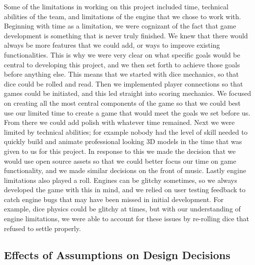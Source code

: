 \documentclass{article}
\begin{document}
Some of the limitations in working on this project included time, technical abilities of the team, and limitations of the engine that we chose to work with. Beginning with time as a limitation, we were cognizant of the fact that game development is something that is never truly finished. We knew that there would always be more features that we could add, or ways to improve existing functionalities. This is why we were very clear on what specific goals would be central to developing this project, and we then set forth to achieve those goals before anything else. This means that we started with dice mechanics, so that dice could be rolled and read. Then we implemented player connections so that games could be initiated, and this led straight into scoring mechanics. We focused on creating all the most central components of the game so that we could best use our limited time to create a game that would meet the goals we set before us. From there we could add polish with whatever time remained. Next we were limited by technical abilities; for example nobody had the level of skill needed to quickly build and animate professional looking 3D models in the time that was given to us for this project. In response to this we made the decision that we would use open source assets so that we could better focus our time on game functionality, and we made similar decisions on the front of music. Lastly engine limitations also played a roll. Engines can be glitchy sometimes, so we always developed the game with this in mind, and we relied on user testing feedback to catch engine bugs that may have been missed in initial development. For example, dice physics could be glitchy at times, but with our understanding of engine limitations, we were able to account for these issues by re-rolling dice that refused to settle properly.

\subsection{Effects of Assumptions on Design Decisions}
\end{document}
